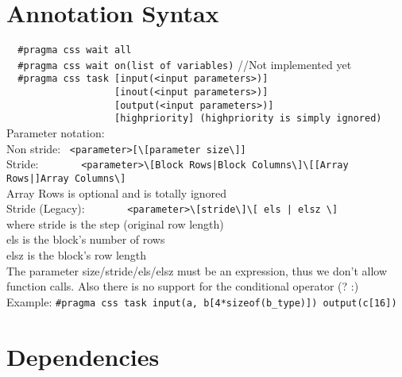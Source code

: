 \documentclass[letterpaper]{article}
\begin{document}
\section{Annotation Syntax}

    \verb!  #pragma css wait all!\\
    \verb!  #pragma css wait on(list of variables)! //Not implemented yet\\
    \verb!  #pragma css task [input(<input parameters>)]!\\
    \verb!                   [inout(<input parameters>)]!\\
    \verb!                   [output(<input parameters>)]!\\
    \verb!                   [highpriority] (highpriority is simply ignored)!\\[1em]
    Parameter notation:\\

      Non stride: \ \verb!<parameter>[\[parameter size\]]!\\
      
      Stride: \ \ \ \ \ \ \ \verb!<parameter>\[Block Rows|Block Columns\]\[[Array Rows|]Array Columns\]!\\
        \hspace{2cm}Array Rows is optional and is totally ignored\\
      
      Stride (Legacy): \ \ \ \ \ \ \ \verb!<parameter>\[stride\]\[ els | elsz \]!\\
        \hspace{2cm}where stride is the step (original row length)\\
        \hspace{2cm}els is the block's number of rows\\
        \hspace{2cm}elsz is the block's row length\\

      The parameter size/stride/els/elsz must be an expression, thus
      we don't allow function calls. Also there is no support for the
      conditional operator (? :)\\
      
    Example:
      \verb!#pragma css task input(a, b[4*sizeof(b_type)]) output(c[16])!


\section{Dependencies}
\end{document}
